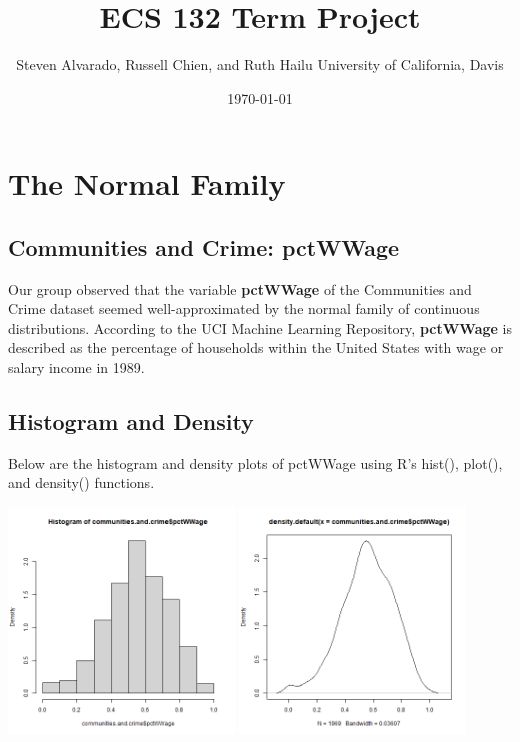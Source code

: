 \documentclass[12pt, letterpaper]{report}
\title{\textbf{ECS 132 Term Project}}
\author{\parbox{\linewidth}{\centering%
  Steven Alvarado, Russell Chien, and Ruth Hailu\endgraf\bigskip
  University of California, Davis}}
\date{\monthyeardate\today}
\begin{document}
\maketitle

\chapter{The Normal Family}
\section{Communities and Crime: pctWWage}
Our group observed that the variable \textbf{pctWWage} of the Communities and Crime dataset seemed well-approximated by the normal family of continuous distributions.
According to the UCI Machine Learning Repository, \textbf{pctWWage} is described as the percentage of households within the United States with wage or salary income in 1989.

\section{Histogram and Density}
Below are the histogram and density plots of pctWWage using R's hist(), plot(), and density() functions.
\begin{center}
\includegraphics[width=0.45\textwidth]{normal/pctWWage_hist}
\includegraphics[width=0.45\textwidth]{normal/pctWWage_density}
\end{center}
\end{document}
